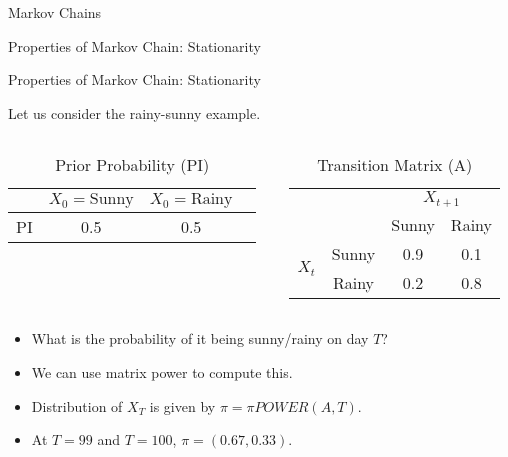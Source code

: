 \documentclass{beamer}
\begin{document}
\begin{section}{Markov Chains}
\begin{frame}{Properties of Markov Chain: Stationarity}
\begin{itemize}
        \end{itemize}
      \end{frame}

      \begin{frame}{Properties of Markov Chain: Stationarity}

        Let us consider the rainy-sunny example.
      
        \begin{columns}[T] %
          \begin{column}{0.48\textwidth} %
            \begin{table}[h]
              \centering
              \caption{Prior Probability (PI)}
              \begin{tabular}{cccc}
                \toprule
                & \(X_0 = \text{Sunny}\) & \(X_0 = \text{Rainy}\) \\
                \midrule
                PI & 0.5 & 0.5 \\
                \bottomrule
              \end{tabular}
            \end{table}
          \end{column}
          \begin{column}{0.48\textwidth} %
            \begin{table}[h]
              \centering
              \caption{Transition Matrix (A)}
              \begin{tabular}{cccc}
                \toprule
                & & \multicolumn{2}{c}{\(X_{t+1}\)} \\
                \cmidrule{3-4}
                & & Sunny & Rainy \\
                \midrule
                \multirow{2}{*}{\(X_t\)} & Sunny & 0.9 & 0.1 \\
                & Rainy & 0.2 & 0.8 \\
                \bottomrule
              \end{tabular}
            \end{table}
          \end{column}
        \end{columns}

        \begin{itemize}
            \item What is the probability of it being sunny/rainy on day $T$?
            \pause \item We can use matrix power to compute this.
            \pause \item Distribution of $X_T$ is given by $\pi = \pi POWER(A, T)$.
            \pause \item At $T=99$ and $T=100$, $\pi = (0.67, 0.33)$.


\end{itemize}
\end{frame}
\end{section}
\end{document}
